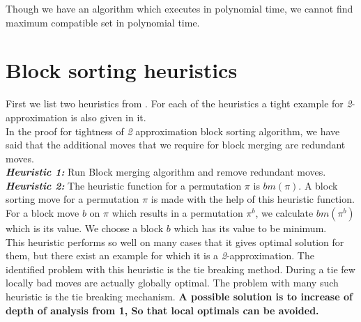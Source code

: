 \documentclass[BTech]{iitmdiss}
\begin{document}
\noindent Though we have an algorithm which executes in polynomial time, we cannot find maximum compatible set in polynomial time. 
\chapter{Block sorting heuristics}
First we list two heuristics from \citep{mahajan2008block}. For each of the heuristics a tight example for \textit{2}-approximation is also given in it.\\
In the proof for tightness of \textit{2} approximation block sorting algorithm, we have said that the additional moves that we require for block merging are redundant moves.\\ 
\textit{\textbf{Heuristic 1:}} Run Block merging algorithm and remove redundant moves.\\
\textit{\textbf{Heuristic 2:}} The heuristic function for a permutation $\pi$ is $bm(\pi)$. A block sorting move for a permutation $\pi$ is made with the help of this heuristic function. For a block move $b$ on $\pi$ which results in a permutation $\pi^b$, we calculate $bm(\pi^b)$ which is its value. We choose a block $b$ which has its value to be minimum.\\
This heuristic performs so well on many cases that it gives optimal solution for them, but there exist an example for which it is a \textit{2}-approximation. The identified problem with this heuristic is the tie breaking method. During a tie few locally bad moves are actually globally optimal. The problem with many such heuristic is the tie breaking mechanism. \textbf{A possible solution is to increase of depth of analysis from 1, So that local optimals can be avoided.}\\
\end{document}
